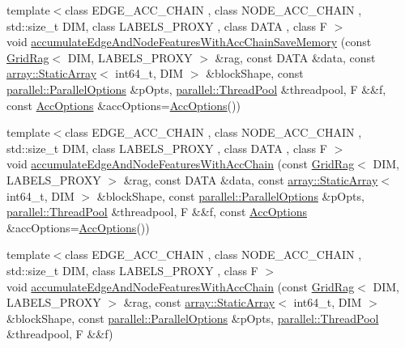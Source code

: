 \begin{DoxyCompactItemize}
\item 
{\footnotesize template$<$class E\+D\+G\+E\+\_\+\+A\+C\+C\+\_\+\+C\+H\+A\+I\+N , class N\+O\+D\+E\+\_\+\+A\+C\+C\+\_\+\+C\+H\+A\+I\+N , std\+::size\+\_\+t D\+I\+M, class L\+A\+B\+E\+L\+S\+\_\+\+P\+R\+O\+X\+Y , class D\+A\+T\+A , class F $>$ }\\void \hyperlink{namespacenifty_1_1graph_a8bba7bf00968cb611c2b01bddfe6f2fd}{accumulate\+Edge\+And\+Node\+Features\+With\+Acc\+Chain\+Save\+Memory} (const \hyperlink{classnifty_1_1graph_1_1GridRag}{Grid\+Rag}$<$ D\+I\+M, L\+A\+B\+E\+L\+S\+\_\+\+P\+R\+O\+X\+Y $>$ \&rag, const D\+A\+T\+A \&data, const \hyperlink{namespacenifty_1_1array_a683f151f19c851754e0c6d55ed16a0c2}{array\+::\+Static\+Array}$<$ int64\+\_\+t, D\+I\+M $>$ \&block\+Shape, const \hyperlink{classnifty_1_1parallel_1_1ParallelOptions}{parallel\+::\+Parallel\+Options} \&p\+Opts, \hyperlink{classnifty_1_1parallel_1_1ThreadPool}{parallel\+::\+Thread\+Pool} \&threadpool, F \&\&f, const \hyperlink{structnifty_1_1graph_1_1AccOptions}{Acc\+Options} \&acc\+Options=\hyperlink{structnifty_1_1graph_1_1AccOptions}{Acc\+Options}())
\item 
{\footnotesize template$<$class E\+D\+G\+E\+\_\+\+A\+C\+C\+\_\+\+C\+H\+A\+I\+N , class N\+O\+D\+E\+\_\+\+A\+C\+C\+\_\+\+C\+H\+A\+I\+N , std\+::size\+\_\+t D\+I\+M, class L\+A\+B\+E\+L\+S\+\_\+\+P\+R\+O\+X\+Y , class D\+A\+T\+A , class F $>$ }\\void \hyperlink{namespacenifty_1_1graph_a8f3282d2d63b3f644bf2176ed21d3082}{accumulate\+Edge\+And\+Node\+Features\+With\+Acc\+Chain} (const \hyperlink{classnifty_1_1graph_1_1GridRag}{Grid\+Rag}$<$ D\+I\+M, L\+A\+B\+E\+L\+S\+\_\+\+P\+R\+O\+X\+Y $>$ \&rag, const D\+A\+T\+A \&data, const \hyperlink{namespacenifty_1_1array_a683f151f19c851754e0c6d55ed16a0c2}{array\+::\+Static\+Array}$<$ int64\+\_\+t, D\+I\+M $>$ \&block\+Shape, const \hyperlink{classnifty_1_1parallel_1_1ParallelOptions}{parallel\+::\+Parallel\+Options} \&p\+Opts, \hyperlink{classnifty_1_1parallel_1_1ThreadPool}{parallel\+::\+Thread\+Pool} \&threadpool, F \&\&f, const \hyperlink{structnifty_1_1graph_1_1AccOptions}{Acc\+Options} \&acc\+Options=\hyperlink{structnifty_1_1graph_1_1AccOptions}{Acc\+Options}())
\item 
{\footnotesize template$<$class E\+D\+G\+E\+\_\+\+A\+C\+C\+\_\+\+C\+H\+A\+I\+N , class N\+O\+D\+E\+\_\+\+A\+C\+C\+\_\+\+C\+H\+A\+I\+N , std\+::size\+\_\+t D\+I\+M, class L\+A\+B\+E\+L\+S\+\_\+\+P\+R\+O\+X\+Y , class F $>$ }\\void \hyperlink{namespacenifty_1_1graph_a5e388756ae7e421f92ef5f78494b94d7}{accumulate\+Edge\+And\+Node\+Features\+With\+Acc\+Chain} (const \hyperlink{classnifty_1_1graph_1_1GridRag}{Grid\+Rag}$<$ D\+I\+M, L\+A\+B\+E\+L\+S\+\_\+\+P\+R\+O\+X\+Y $>$ \&rag, const \hyperlink{namespacenifty_1_1array_a683f151f19c851754e0c6d55ed16a0c2}{array\+::\+Static\+Array}$<$ int64\+\_\+t, D\+I\+M $>$ \&block\+Shape, const \hyperlink{classnifty_1_1parallel_1_1ParallelOptions}{parallel\+::\+Parallel\+Options} \&p\+Opts, \hyperlink{classnifty_1_1parallel_1_1ThreadPool}{parallel\+::\+Thread\+Pool} \&threadpool, F \&\&f)

\end{DoxyCompactItemize}
